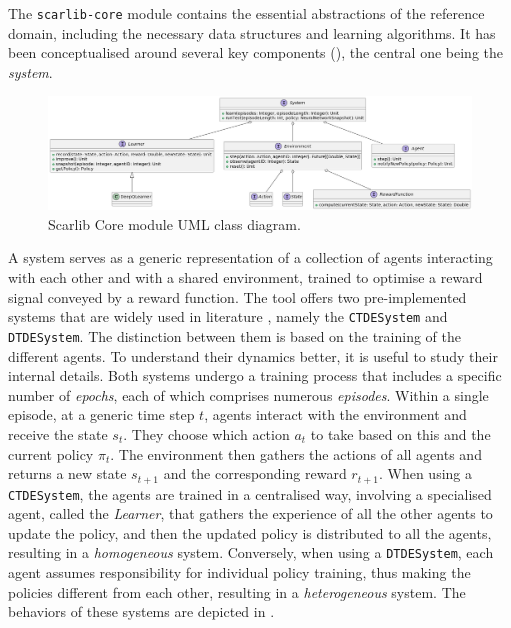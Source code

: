 \documentclass[12pt,a4paper,openright,twoside]{book}
\begin{document}
The \texttt{scarlib-core} module contains the essential abstractions of the reference domain, including the necessary data structures 
    and learning algorithms. It has been conceptualised around several key components (), the central one being the \emph{system}.
    \begin{figure}[t]
        \centering
        \includegraphics[width=\textwidth]{figures/uml-core.png}
        \caption{Scarlib Core module UML class diagram.}
        \label{fig:uml-core}
    \end{figure}
    A system serves as a generic representation of a collection of agents interacting with each other and with a shared 
    environment, trained to optimise a reward signal conveyed by a reward function. The tool offers two pre-implemented 
    systems that are widely used in literature \cite{Du2020}, namely the \texttt{CTDESystem} and \texttt{DTDESystem}. The distinction between them is based
    on the training of the different agents. To understand their dynamics better, it is useful to study their internal details. 
    Both systems undergo a training process that includes a specific number of \emph{epochs}, each of which comprises numerous \emph{episodes}. 
    Within a single episode, at a generic time step $t$, agents interact with the environment and receive the state $s_t$. 
    They choose which action $a_t$ to take based on this and the current policy $\pi_t$. The environment then gathers the 
    actions of all agents and returns a new state $s_{t+1}$ and the corresponding reward $r_{t+1}$. 
    When using a \texttt{CTDESystem}, the agents are trained in a centralised way, involving a specialised agent, called the \emph{Learner}, 
    that gathers the experience of all the other agents to update the policy, and then the updated policy is distributed to all 
    the agents,  resulting in a \emph{homogeneous} system. 
    Conversely, when using a \texttt{DTDESystem}, each agent assumes responsibility for individual policy training,
    thus making the policies different from each other, resulting in a \emph{heterogeneous} system. 
    The behaviors of these systems are depicted in .
    
\end{document}
